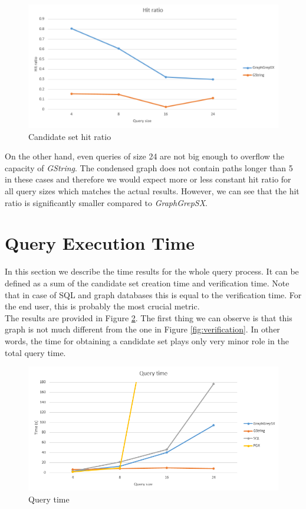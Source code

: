 \begin{figure}[h]
	\centering
	\includegraphics[width=1\textwidth]{../img/hitRatio.pdf}
	\caption{Candidate set hit ratio}
	\label{fig:hitratio}
\end{figure}

On the other hand, even queries of size 24 are not big enough to overflow the capacity of \textit{GString}. The condensed graph does not contain paths longer than 5 in these cases and therefore we would expect more or less constant hit ratio for all query sizes which matches the actual results. However, we can see that the hit ratio is significantly smaller compared to \textit{GraphGrepSX}.

\section{Query Execution Time}
In this section we describe the time results for the whole query process. It can be defined as a sum of the candidate set creation time and verification time. Note that in case of SQL and graph databases this is equal to the verification time. For the end user, this is probably the most crucial metric.\\

The results are provided in Figure \ref{fig:querytime}. The first thing we can observe is that this graph is not much different from the one in Figure \ref{fig:verification}. In other words, the time for obtaining a candidate set plays only very minor role in the total query time.\\

\begin{figure}[h]
	\centering
	\includegraphics[width=1\textwidth]{../img/queryTime.png}
	\caption{Query time}
	\label{fig:querytime}
\end{figure}

